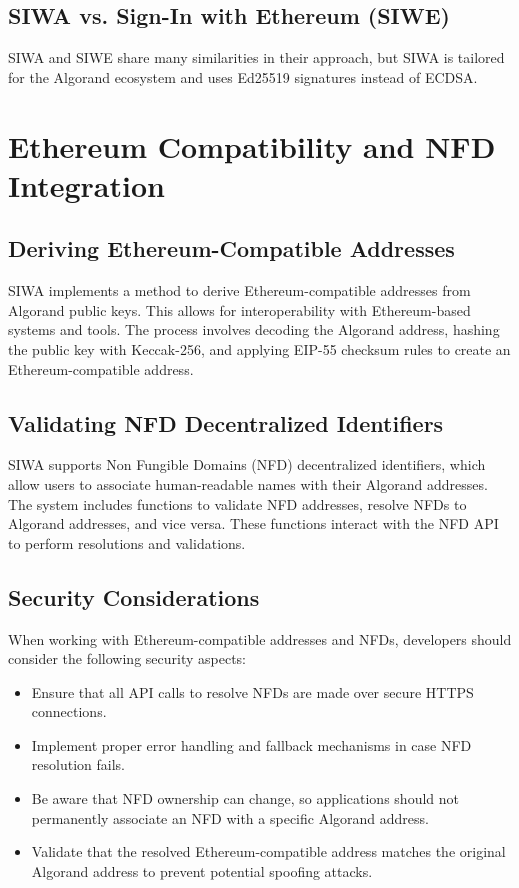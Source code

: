 \documentclass[12pt, a4paper, twocolumn]{article}
\begin{document}
\subsection{SIWA vs. Sign-In with Ethereum (SIWE)}

SIWA and SIWE share many similarities in their approach, but SIWA is tailored for the Algorand ecosystem and uses Ed25519 signatures instead of ECDSA.

\section{Ethereum Compatibility and NFD Integration}

\subsection{Deriving Ethereum-Compatible Addresses}

SIWA implements a method to derive Ethereum-compatible addresses from Algorand public keys. This allows for interoperability with Ethereum-based systems and tools. The process involves decoding the Algorand address, hashing the public key with Keccak-256, and applying EIP-55 checksum rules to create an Ethereum-compatible address.

\subsection{Validating NFD Decentralized Identifiers}

SIWA supports Non Fungible Domains (NFD) decentralized identifiers, which allow users to associate human-readable names with their Algorand addresses. The system includes functions to validate NFD addresses, resolve NFDs to Algorand addresses, and vice versa. These functions interact with the NFD API to perform resolutions and validations.

\subsection{Security Considerations}

When working with Ethereum-compatible addresses and NFDs, developers should consider the following security aspects:

\begin{itemize}
  \item Ensure that all API calls to resolve NFDs are made over secure HTTPS connections.
  \item Implement proper error handling and fallback mechanisms in case NFD resolution fails.
  \item Be aware that NFD ownership can change, so applications should not permanently associate an NFD with a specific Algorand address.
  \item Validate that the resolved Ethereum-compatible address matches the original Algorand address to prevent potential spoofing attacks.
\end{itemize}
\end{document}
